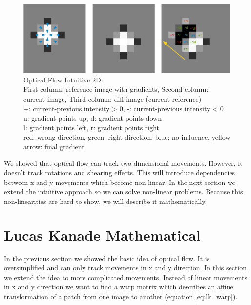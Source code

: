 \documentclass[11pt,a4paper,titlepage,oneside]{report}
\begin{document}
\begin{figure}[H]
  \includegraphics[width=1.0\textwidth]{img/optical_flow_2d.png}
  \caption{Optical Flow Intuitive 2D:\\
		First column: reference image with gradients, Second column: current image, Third column: diff image (current-reference)\\
		+: current-previous intensity > 0, -: current-previous intensity < 0\\
		u: gradient points up, d: gradient points down\\
		l: gradient points left, r: gradient points right\\
		red: wrong direction, green: right direction, blue: no influence, yellow arrow: final gradient}\label{fig:optical_flow_2d}
\end{figure}

We showed that optical flow can track two dimensional movements. However, it doesn't track rotations and shearing effects. This will introduce dependencies between x and y movements which become non-linear. In the next section we extend the intuitive approach so we can solve non-linear problems. Because this non-linearities are hard to show, we will describe it mathematically.

\section{Lucas Kanade Mathematical}

In the previous section we showed the basic idea of optical flow. It is oversimplified and can only track movements in x and y direction. In this section we extend the idea to more complicated movements. Instead of linear movements in x and y direction we want to find a warp matrix which describes an affine transformation of a patch from one image to another (equation \ref{eq:lk_warp}).
\end{document}
